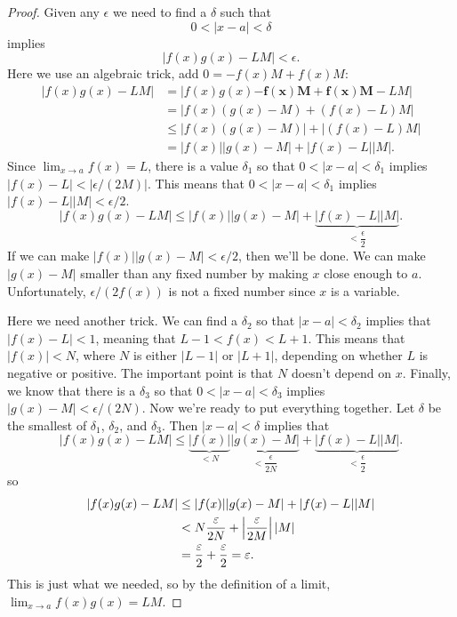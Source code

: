 \begin{proof} 
Given any $\epsilon$ we need to find a $\delta$ such that
\[
0<|x - a|< \delta
\]
implies 
\[
|f(x)g(x)-LM|< \epsilon.  
\]
Here we use an algebraic trick, add $0 = -f(x)M+f(x)M$:
\begin{align*}
|f(x)g(x)-LM| &= |f(x)g(x)\boldsymbol{-f(x)M+f(x)M}-LM| \\
&=|f(x)(g(x)-M)+(f(x)-L)M| \\
&\le |f(x)(g(x)-M)|+|(f(x)-L)M| \\
&=|f(x)||g(x)-M|+|f(x)-L||M|.
\end{align*}
Since $\lim_{x\to a}f(x) =L$, there is a value $\delta_1$ so that
$0<|x-a|<\delta_1$ implies $|f(x)-L|<|\epsilon/(2M)|$. This means that
$0<|x-a|<\delta_1$ implies $|f(x)-L||M|< \epsilon/2$. 
\[
|f(x)g(x)-LM|\le|f(x)||g(x)-M|+\underbrace{|f(x)-L||M|}_{<\dfrac{\epsilon}{2}}.
\]
If we can make $|f(x)||g(x)-M|<\epsilon/2$, then we'll be done. We can
make $|g(x)-M|$ smaller than any fixed number by making $x$ close
enough to $a$. Unfortunately, $\epsilon/(2f(x))$ is not a fixed number
since $x$ is a variable.

Here we need another trick. We can find a $\delta_2$ so that
$|x-a|<\delta_2$ implies that $|f(x)-L|<1$, meaning that $L-1 < f(x) <
L+1$. This means that $|f(x)|<N$, where $N$ is either $|L-1|$ or
$|L+1|$, depending on whether $L$ is negative or positive. The
important point is that $N$ doesn't depend on $x$. Finally, we know
that there is a $\delta_3$ so that $0<|x-a|<\delta_3$ implies
$|g(x)-M|<\epsilon/(2N)$. Now we're ready to put everything
together. Let $\delta$ be the smallest of $\delta_1$, $\delta_2$, and
$\delta_3$. Then $|x-a|<\delta$ implies that
\[
|f(x)g(x)-LM|\le\underbrace{|f(x)|}_{<N}\underbrace{|g(x)-M|}_{<\dfrac{\epsilon}{2N}}+\underbrace{|f(x)-L||M|}_{<\dfrac{\epsilon}{2}}.
\]
so
\begin{align*}
|f(x)g(x)-LM|&\le|f(x)||g(x)-M|+|f(x)-L||M| \\
&<N{\epsilon\over 2N}+\left|{\epsilon\over 2M}\right||M| \\
&={\epsilon\over 2}+{\epsilon\over 2}=\epsilon.
\end{align*}
This is just what we needed, so by the definition of a limit,
$\lim_{x\to a}f(x)g(x)=LM$.
\end{proof}



